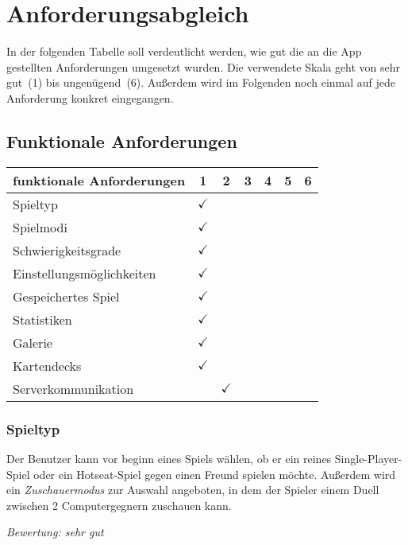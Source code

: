 \chapter{Anforderungsabgleich}
\label{cha:anforderungsabgleich}

In der folgenden Tabelle soll verdeutlicht werden, wie gut die an die App gestellten Anforderungen umgesetzt wurden. Die verwendete Skala geht von \glqq sehr gut\grqq\ (1) bis \glqq ungenügend\grqq\ (6). Außerdem wird im Folgenden noch einmal auf jede Anforderung konkret eingegangen.

\section{Funktionale Anforderungen}
\label{sec:abgleich_funtionaleanforderungen}

\begin{table}[ht]
\centering
\begin{tabular}{l|c c c c c c}
funktionale Anforderungen & 1 & 2 & 3 & 4 & 5 & 6 \\ \hline\hline
Spieltyp & $\checkmark$ &  &  &  &  &   \\
Spielmodi & $\checkmark$ &  &  &  &  & \\
Schwierigkeitsgrade & $\checkmark$ &  &  &  &  & \\
Einstellungsmöglichkeiten & $\checkmark$ &  &  &  &  & \\
Gespeichertes Spiel & $\checkmark$ &  &  &  &  & \\
Statistiken & $\checkmark$ &  &  &  &  & \\
Galerie & $\checkmark$ &  &  &  &  & \\
Kartendecks & $\checkmark$ &  &  &  &  & \\
Serverkommunikation &  & $\checkmark$ &  &  &  &
\end{tabular}
\label{tab:abgleich_funktionaleanforderungen}
\end{table}

\subsection{Spieltyp}
Der Benutzer kann vor beginn eines Spiels wählen, ob er ein reines Single-Player-Spiel oder ein Hotseat-Spiel gegen einen Freund spielen möchte. Außerdem wird ein \emph{Zuschauermodus} zur Auswahl angeboten, in dem der Spieler einem Duell zwischen 2 Computergegnern zuschauen kann.

\vspace{5mm}
\emph{Bewertung: sehr gut}
\vspace{5mm}

